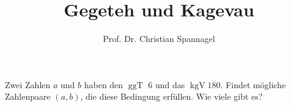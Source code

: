 \documentclass{cssheet}
\title{Gegeteh und Kagevau}
\author{Prof. Dr. Christian Spannagel}
\begin{document}
\printtitle 

\vspace*{10mm}

\begin{aufgabe}
	Zwei Zahlen $a$ und $b$ haben den $\operatorname{ggT}$ $6$ und das $\operatorname{kgV} 180$. Findet mögliche Zahlenpaare $(a,b)$, die diese Bedingung erfüllen. Wie viele gibt es?
\end{aufgabe}

\vspace*{10mm}
\printlicense

\printsocials
\end{document}
